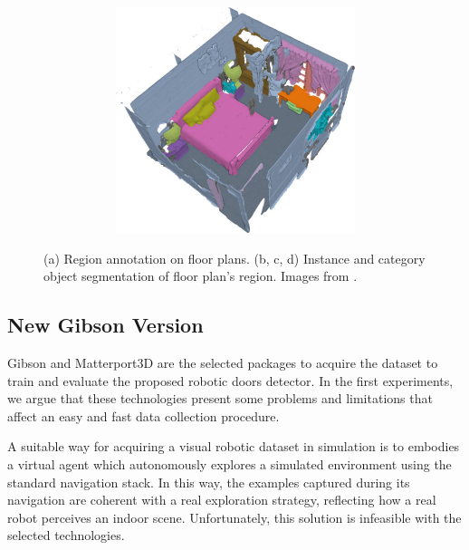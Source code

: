 \begin{figure}[h!]
\begin{subfigure}[b]{\linewidth}
\begin{subfigure}[b]{0.32\linewidth}
			\caption{}
			\label{fig:matterport_object_annotation_2}
		\end{subfigure}
		\hfil
		\begin{subfigure}[b]{0.32\linewidth}
			\centering
			\includegraphics[width=\textwidth]{images/matterport_room22_categories.pdf}
			\caption{}
			\label{fig:matterport_object_annotation_3}
		\end{subfigure}
	\end{subfigure}
	\caption{(a) Region annotation on floor plans. (b, c, d) Instance and category object segmentation of floor plan's region. Images from \cite{matterport}.}
\end{figure}

\subsection{New Gibson Version}

Gibson and Matterport3D are the selected packages to acquire the dataset to train and evaluate the proposed robotic doors detector. In the first experiments, we argue that these technologies present some problems and limitations that affect an easy and fast data collection procedure. 

A suitable way for acquiring a visual robotic dataset in simulation is to embodies a virtual agent which autonomously explores a simulated environment using the standard navigation stack. In this way, the examples captured during its navigation are coherent with a real exploration strategy, reflecting how a real robot perceives an indoor scene. Unfortunately, this solution is infeasible with the selected technologies. 

